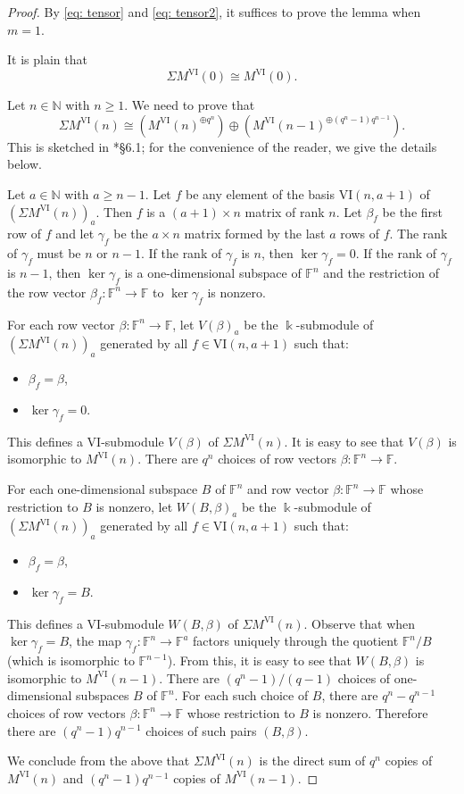 \documentclass{amsart}
\numberwithin{equation}{section}
\newcommand{\N}{{\mathbb{N}}}
\newcommand{\F}{{\mathbb{F}}}
\newcommand{\VI}{{\mathrm{VI}}}
\begin{document}
\begin{proof}
   By \eqref{eq: tensor} and \eqref{eq: tensor2}, it suffices to prove the lemma when $m=1$. 
   
   It is plain that 
   \[ \Sigma M^{\VI}(0) \cong M^{\VI}(0). \]

   Let $n\in \N$ with $n\geqslant 1$. We need to prove that 
   \[    \Sigma M^{\VI}(n) \cong \left( M^{\VI}(n)^{\oplus q^n} \right) \oplus \left( M^{\VI}(n-1)^{\oplus (q^n-1)q^{n-1}} \right).   \]
   This is sketched in \cite{gl_coinduction}*{\S6.1}; for the convenience of the reader, we give the details below.

   Let $a\in \N$ with $a\geqslant n-1$. Let $f$ be any element of the basis $\VI(n,a+1)$ of $(\Sigma M^{\VI}(n))_a$. Then $f$ is a $(a+1)\times n$ matrix of rank $n$. Let $\beta_f$ be the first row of $f$ and let $\gamma_f$ be the $a\times n$ matrix formed by the last $a$ rows of $f$. The rank of $\gamma_f$ must be $n$ or $n-1$. If the rank of $\gamma_f$ is $n$, then $\ker \gamma_f = 0$.
   If the rank of $\gamma_f$ is $n-1$, then $\ker \gamma_f$ is a one-dimensional subspace of $\F^n$ and the restriction of the row vector $\beta_f: \F^n \to \F$ to $\ker \gamma_f$ is nonzero. 

   For each row vector $\beta: \F^n \to \F$, let $V(\beta)_a$ be the $\Bbbk$-submodule of $(\Sigma M^{\VI}(n))_a$ generated by all $f\in \VI(n, a+1)$ such that: 
   \begin{itemize}
      \item $\beta_f=\beta$,
      \item $\ker \gamma_f = 0$.
   \end{itemize}
   This defines a $\VI$-submodule $V(\beta)$ of $\Sigma M^{\VI}(n)$. It is easy to see that $V(\beta)$ is isomorphic to $M^{\VI}(n)$. There are $q^n$ choices of row vectors $\beta:\F^n \to \F$.

   For each one-dimensional subspace $B$ of $\F^n$ and row vector $\beta: \F^n\to \F$ whose restriction to $B$ is nonzero, let $W(B, \beta)_a$ be the $\Bbbk$-submodule of $(\Sigma M^{\VI}(n))_a$ generated by all $f\in \VI(n, a+1)$ such that:
   \begin{itemize}
      \item $\beta_f=\beta$,
      \item $\ker \gamma_f=B$.
   \end{itemize}
   This defines a $\VI$-submodule $W(B, \beta)$ of $\Sigma M^{\VI}(n)$. Observe that when $\ker \gamma_f=B$, the map $\gamma_f: \F^n\to \F^a$ factors uniquely through the quotient $\F^n/B$ (which is isomorphic to $\F^{n-1}$).
   From this, it is easy to see that $W(B, \beta)$ is isomorphic to $M^{\VI}(n-1)$. There are $(q^n-1)/(q-1)$ choices of one-dimensional subspaces $B$ of $\F^n$. For each such choice of $B$, there are $q^n-q^{n-1}$ choices of row vectors $\beta: \F^n \to \F$ whose restriction to $B$ is nonzero. Therefore there are $(q^n-1)q^{n-1}$ choices of such pairs $(B, \beta)$.

   We conclude from the above that $\Sigma M^{\VI}(n)$ is the direct sum of $q^n$ copies of $M^{\VI}(n)$ and $(q^n-1)q^{n-1}$ copies of $M^{\VI}(n-1)$.
\end{proof}
\end{document}
